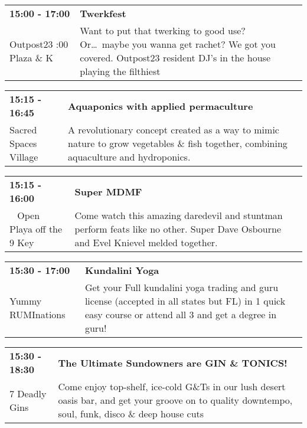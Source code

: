 \begin{tabular}{ p{1in} p{2.2in} }
    \textbf{15:00 - 17:00} & \textbf{Twerkfest} \\
    Outpost23 \newline 6:00 Plaza \& K & Want to put that twerking to good use? Or\ldots\ maybe you wanna get rachet? We got you covered. Outpost23 resident DJ's in the house playing the filthiest \\
    \hline 
\end{tabular}
    
\begin{tabular}{ p{1in} p{2.2in} }
    \textbf{15:15 - 16:45} & \textbf{Aquaponics with applied permaculture} \\
    Sacred Spaces Village \newline  & A revolutionary concept created as a way to mimic nature to grow vegetables \& fish together, combining aquaculture and hydroponics. \\
    \hline 
\end{tabular}
    
\begin{tabular}{ p{1in} p{2.2in} }
    \textbf{15:15 - 16:00} & \textbf{Super MDMF} \\
    ~ \newline Open Playa off the 9 Key & Come watch this amazing daredevil and stuntman perform feats like no other.  Super Dave Osbourne and Evel Knievel melded together. \\
    \hline 
\end{tabular}
    
\begin{tabular}{ p{1in} p{2.2in} }
    \textbf{15:30 - 17:00} & \textbf{Kundalini Yoga} \\
    Yummy RUMInations \newline  & Get your Full kundalini yoga trading and guru license (accepted in all states but FL) in 1 quick easy course or attend all 3 and get a degree in guru! \\
    \hline 
\end{tabular}
    
\begin{tabular}{ p{1in} p{2.2in} }
    \textbf{15:30 - 18:30} & \textbf{The Ultimate Sundowners are GIN \& TONICS!} \\
    7 Deadly Gins \newline  & Come enjoy top-shelf, ice-cold G\&Ts in our lush desert oasis bar, and get your groove on to quality downtempo, soul, funk, disco \& deep house cuts \\
    \hline 
\end{tabular}
    
